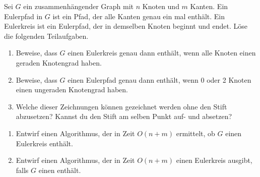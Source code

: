\documentclass{uebung_cs}
\begin{document}
\begin{aufgabe}
	Sei $G$ ein zusammenhängender Graph mit $n$ Knoten und $m$ Kanten.
	Ein Eulerpfad in $G$ ist ein Pfad, der alle Kanten genau ein mal enthält.
	Ein Eulerkreis ist ein Eulerpfad, der in demselben Knoten beginnt und endet.
	Löse die folgenden Teilaufgaben.
	\begin{enumerate}
		\item \note %
    Beweise, dass $G$ einen Eulerkreis genau dann enthält, wenn alle Knoten einen geraden Knotengrad haben.
		\item \note %
    Beweise, dass $G$ einen Eulerpfad genau dann enthält, wenn 0 oder 2 Knoten einen ungeraden Knotengrad haben.
		\item \bestehen Welche dieser Zeichnungen können gezeichnet werden ohne den Stift abzusetzen?
		Kannst du den Stift am selben Punkt auf- und absetzen?
	\end{enumerate}
	\begin{center}
		\hspace{1.5cm}
		\hspace{1.5cm}
	\end{center}
	\begin{enumerate}[resume]
		\item \bestehen Entwirf einen Algorithmus, der in Zeit $O(n+m)$ ermittelt, ob $G$ einen Eulerkreis enthält.
		\item \note %
    Entwirf einen Algorithmus, der in Zeit $O(n+m)$ einen Eulerkreis ausgibt, falls $G$ einen enthält.
	\end{enumerate}	
\end{aufgabe}
\end{document}
